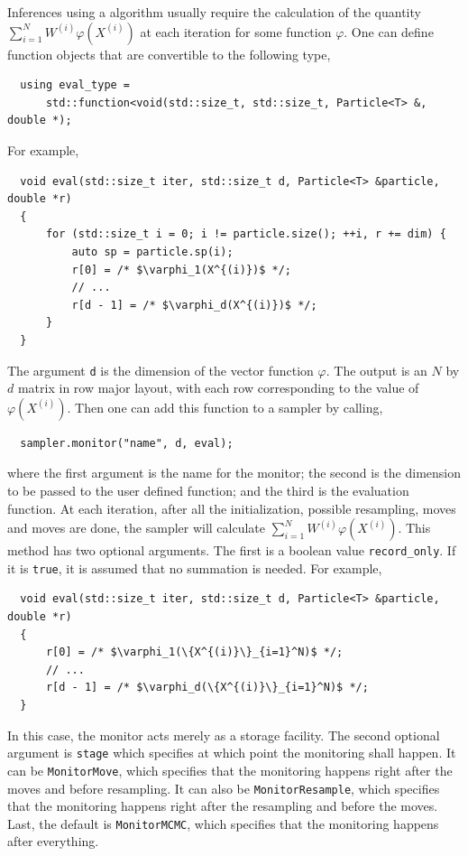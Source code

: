 Inferences using a \smc algorithm usually require the calculation of the
quantity $\sum_{i=1}^NW^{(i)}\varphi(X^{(i)})$ at each iteration for some
function $\varphi$. One can define function objects that are convertible to the
following type,
\begin{Verbatim}
  using eval_type =
      std::function<void(std::size_t, std::size_t, Particle<T> &, double *);
\end{Verbatim}
For example,
\begin{Verbatim}
  void eval(std::size_t iter, std::size_t d, Particle<T> &particle, double *r)
  {
      for (std::size_t i = 0; i != particle.size(); ++i, r += dim) {
          auto sp = particle.sp(i);
          r[0] = /* $\varphi_1(X^{(i)})$ */;
          // ...
          r[d - 1] = /* $\varphi_d(X^{(i)})$ */;
      }
  }
\end{Verbatim}
The argument \verb|d| is the dimension of the vector function $\varphi$. The
output is an $N$ by $d$ matrix in row major layout, with each row corresponding
to the value of $\varphi(X^{(i)})$. Then one can add this function to a sampler
by calling,
\begin{Verbatim}
  sampler.monitor("name", d, eval);
\end{Verbatim}
where the first argument is the name for the monitor; the second is the
dimension to be passed to the user defined function; and the third is the
evaluation function. At each iteration, after all the initialization, possible
resampling, moves and \mcmc moves are done, the sampler will calculate
$\sum_{i=1}^NW^{(i)}\varphi(X^{(i)})$. This method has two optional arguments.
The first is a boolean value \verb|record_only|. If it is \verb|true|, it is
assumed that no summation is needed. For example,
\begin{Verbatim}
  void eval(std::size_t iter, std::size_t d, Particle<T> &particle, double *r)
  {
      r[0] = /* $\varphi_1(\{X^{(i)}\}_{i=1}^N)$ */;
      // ...
      r[d - 1] = /* $\varphi_d(\{X^{(i)}\}_{i=1}^N)$ */;
  }
\end{Verbatim}
In this case, the monitor acts merely as a storage facility. The second
optional argument is \verb|stage| which specifies at which point the monitoring
shall happen. It can be \verb|MonitorMove|, which specifies that the monitoring
happens right after the moves and before resampling. It can also be
\verb|MonitorResample|, which specifies that the monitoring happens right after
the resampling and before the \mcmc moves. Last, the default is
\verb|MonitorMCMC|, which specifies that the monitoring happens after
everything.

